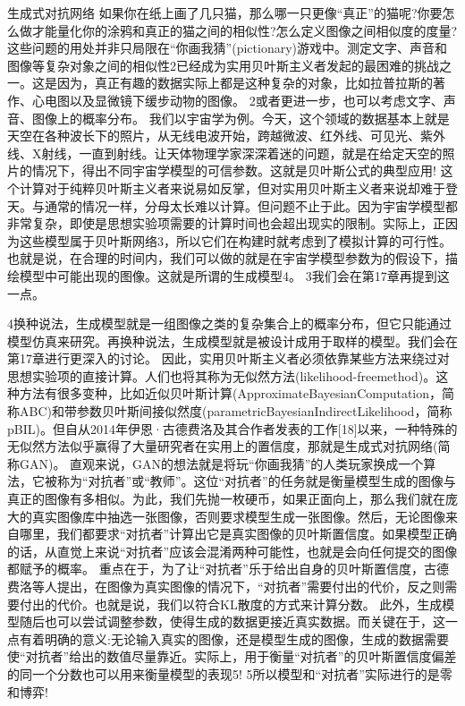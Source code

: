 生成式对抗网络
如果你在纸上画了几只猫，那么哪一只更像“真正”的猫呢?你要怎么做才能量化你的涂鸦和真正的猫之间的相似性?怎么定义图像之间相似度的度量?
这些问题的用处并非只局限在“你画我猜”(pictionary)游戏中。测定文字、声音和图像等复杂对象之间的相似性2已经成为实用贝叶斯主义者发起的最困难的挑战之一。这是因为，真正有趣的数据实际上都是这种复杂的对象，比如拉普拉斯的著作、心电图以及显微镜下缓步动物的图像。
2或者更进一步，也可以考虑文字、声音、图像上的概率分布。
我们以宇宙学为例。今天，这个领域的数据基本上就是天空在各种波长下的照片，从无线电波开始，跨越微波、红外线、可见光、紫外线、X射线，一直到射线。让天体物理学家深深着迷的问题，就是在给定天空的照片的情况下，得出不同宇宙学模型的可信参数。这就是贝叶斯公式的典型应用!
这个计算对于纯粹贝叶斯主义者来说易如反掌，但对实用贝叶斯主义者来说却难于登天。与通常的情况一样，分母太长难以计算。但问题不止于此。因为宇宙学模型都非常复杂，即使是思想实验项需要的计算时间也会超出现实的限制。实际上，正因为这些模型属于贝叶斯网络3，所以它们在构建时就考虑到了模拟计算的可行性。也就是说，在合理的时间内，我们可以做的就是在宇宙学模型参数为的假设下，描绘模型中可能出现的图像。这就是所谓的生成模型4。
3我们会在第17章再提到这一点。

4换种说法，生成模型就是一组图像之类的复杂集合上的概率分布，但它只能通过模型仿真来研究。再换种说法，生成模型就是被设计成用于取样的模型。我们会在第17章进行更深入的讨论。
因此，实用贝叶斯主义者必须依靠某些方法来绕过对思想实验项的直接计算。人们也将其称为无似然方法(likelihood-freemethod)。这种方法有很多变种，比如近似贝叶斯计算(ApproximateBayesianComputation，简称ABC)和带参数贝叶斯间接似然度(parametricBayesianIndirectLikelihood，简称pBIL)。但自从2014年伊恩·古德费洛及其合作者发表的工作[18]以来，一种特殊的无似然方法似乎赢得了大量研究者在实用上的置信度，那就是生成式对抗网络(简称GAN)。
直观来说，GAN的想法就是将玩“你画我猜”的人类玩家换成一个算法，它被称为“对抗者”或“教师”。这位“对抗者”的任务就是衡量模型生成的图像与真正的图像有多相似。为此，我们先抛一枚硬币，如果正面向上，那么我们就在庞大的真实图像库中抽选一张图像，否则要求模型生成一张图像。然后，无论图像来自哪里，我们都要求“对抗者”计算出它是真实图像的贝叶斯置信度。如果模型正确的话，从直觉上来说“对抗者”应该会混淆两种可能性，也就是会向任何提交的图像都赋予的概率。
重点在于，为了让“对抗者”乐于给出自身的贝叶斯置信度，古德费洛等人提出，在图像为真实图像的情况下，“对抗者”需要付出的代价，反之则需要付出的代价。也就是说，我们以符合KL散度的方式来计算分数。
此外，生成模型随后也可以尝试调整参数，使得生成的数据更接近真实数据。而关键在于，这一点有着明确的意义:无论输入真实的图像，还是模型生成的图像，生成的数据需要使“对抗者”给出的数值尽量靠近。实际上，用于衡量“对抗者”的贝叶斯置信度偏差的同一个分数也可以用来衡量模型的表现5!
5所以模型和“对抗者”实际进行的是零和博弈!

